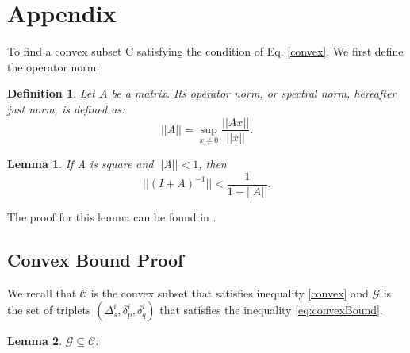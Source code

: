 \documentclass{sig-alternate-05-2015}
\newtheorem{lemma}{Lemma}
\newtheorem{definition}{Definition}
\begin{document}
\appendix
\section{Appendix} \label{AppendixA}
To find a convex subset C satisfying the condition of Eq. \ref{convex},
We first define the operator norm:
\begin{definition}
Let $A$ be a matrix. Its operator norm, or
spectral norm, hereafter just norm, is defined as:
\begin{equation*}
||A|| = \sup_{x \neq 0}\frac{||Ax||}{||x||}.
\end{equation*}
\end{definition}

\begin{lemma} \label{lemma:newman}
If A is square and $||A|| < 1$, then
\begin{equation*}
||(I+A)^{-1}|| < \frac{1}{1-||A||}.
\end{equation*}
\end{lemma}
The proof for this lemma can be found in \cite{gabel2015monitoring}.

\subsection{Convex Bound Proof}
We recall that $\mathcal{C}$ is the convex subset that satisfies
inequality \ref{convex} and $\mathcal{G}$ is the set of triplets
$(\Delta_s^i, \delta_p^i, \delta_q^i)$
 that satisfies the inequality \ref{eq:convexBound}.

\begin{lemma}
$\mathcal{G} \subseteq \mathcal{C}$:
\end{lemma}
\end{document}

